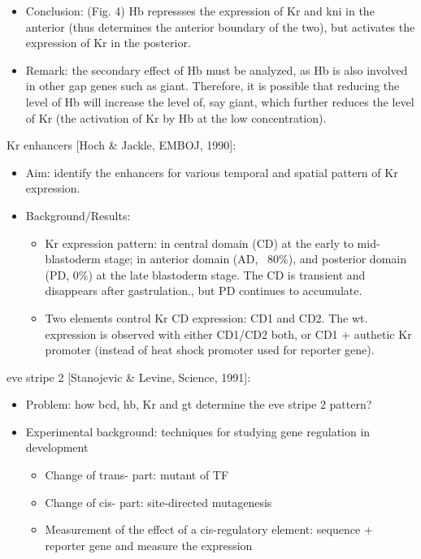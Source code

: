 \documentclass{report}
\begin{document}
\begin{enumerate}
\begin{itemize}
		\item Conclusion: (Fig. 4) Hb repressses the expression of Kr and kni in the anterior (thus determines the anterior boundary of the two), but activates the expression of Kr in the posterior. 
		
		\item Remark: the secondary effect of Hb must be analyzed, as Hb is also involved in other gap genes such as giant. Therefore, it is possible that reducing the level of Hb will increase the level of, say giant, which further reduces the level of Kr (the activation of Kr by Hb at the low concentration). 
	\end{itemize}
	
	Kr enhancers [Hoch \& Jackle, EMBOJ, 1990]:
	\begin{itemize}
		\item Aim: identify the enhancers for various temporal and spatial pattern of Kr expression. 
		
		\item Background/Results: 
		\begin{itemize}
			\item Kr expression pattern: in central domain (CD) at the early to mid- blastoderm stage; in anterior domain (AD, ~80\%), and posterior domain (PD, 0\%) at the late blastoderm stage. The CD is transient and disappears after gastrulation., but PD continues to accumulate. 
			\item Two elements control Kr CD expression: CD1 and CD2. The wt. expression is observed with either CD1/CD2 both, or CD1 + authetic Kr promoter (instead of heat shock promoter used for reporter gene). 
		\end{itemize}
	\end{itemize}
	
	eve stripe 2 [Stanojevic \& Levine, Science, 1991]:
	\begin{itemize}
		\item Problem: how bcd, hb, Kr and gt determine the eve stripe 2 pattern? 
		
		\item Experimental background: techniques for studying gene regulation in development
		\begin{itemize}
			\item Change of trans- part: mutant of TF
			\item Change of cis- part: site-directed mutagenesis
			\item Measurement of the effect of a cis-regulatory element: sequence + reporter gene and measure the expression
		\end{itemize} 
		

\end{itemize}
\end{enumerate}
\end{document}
